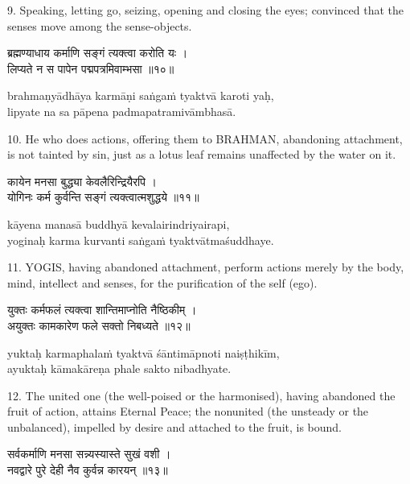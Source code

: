9. Speaking, letting go, seizing, opening and closing the eyes; convinced that
the senses move among the sense-objects.

\begin{gitaverse}
ब्रह्मण्याधाय कर्माणि सङ्गं त्यक्त्वा करोति यः । \\
लिप्यते न स पापेन पद्मपत्रमिवाम्भसा ॥१०॥
\end{gitaverse}

\begin{transliteration}
brahmaṇyādhāya karmāṇi saṅgaṁ tyaktvā karoti yaḥ, \\
lipyate na sa pāpena padmapatramivāmbhasā.
\end{transliteration}

10. He who does actions, offering them to BRAHMAN, abandoning attachment, is
not tainted by sin, just as a lotus leaf remains unaffected by the water on it.

\begin{gitaverse}
कायेन मनसा बुद्ध्या केवलैरिन्द्रियैरपि । \\
योगिनः कर्म कुर्वन्ति सङ्गं त्यक्त्वात्मशुद्धये ॥११॥
\end{gitaverse}

\begin{transliteration}
kāyena manasā buddhyā kevalairindriyairapi, \\
yoginaḥ karma kurvanti saṅgaṁ tyaktvātmaśuddhaye.
\end{transliteration}

11. YOGIS, having abandoned attachment, perform actions merely by the body,
mind, intellect and senses, for the purification of the self (ego).

\begin{gitaverse}
युक्तः कर्मफलं त्यक्त्वा शान्तिमाप्नोति नैष्ठिकीम् । \\
अयुक्तः कामकारेण फले सक्तो निबध्यते ॥१२॥
\end{gitaverse}

\begin{transliteration}
yuktaḥ karmaphalaṁ tyaktvā śāntimāpnoti naiṣṭhikīm, \\
ayuktaḥ kāmakāreṇa phale sakto nibadhyate.
\end{transliteration}

12. The united one (the well-poised or the harmonised), having abandoned the
fruit of action, attains Eternal Peace; the nonunited (the unsteady or the
unbalanced), impelled by desire and attached to the fruit, is bound.

\begin{gitaverse}
सर्वकर्माणि मनसा सन्न्यस्यास्ते सुखं वशी । \\
नवद्वारे पुरे देही नैव कुर्वन्न कारयन् ॥१३॥
\end{gitaverse}

